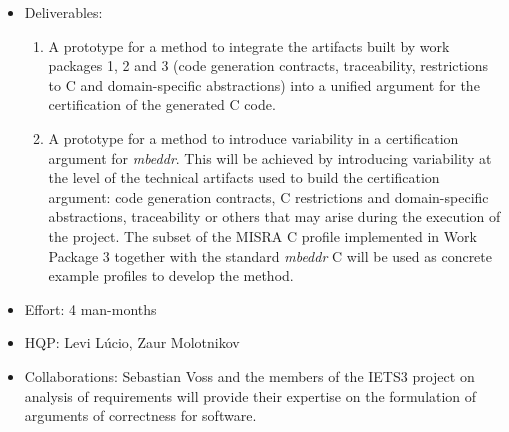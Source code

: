 \begin{itemize}
  \item Deliverables:
  \begin{enumerate}
    \item A prototype for a method to integrate the artifacts built by work
    packages 1, 2 and 3 (code generation contracts, traceability, restrictions to C and
domain-specific abstractions) into a unified argument for the certification of
the generated C code.
\item A prototype for a method to introduce variability in a certification
argument for \emph{mbeddr}. This will be achieved by introducing variability at
the level of the technical artifacts used to build the certification argument:
code generation contracts, C restrictions and domain-specific abstractions,
traceability or others that may arise during the execution of the project. The
subset of the MISRA C profile implemented in Work Package 3 together with the
standard \emph{mbeddr} C will be used as concrete example profiles to develop
the method.
  \end{enumerate}
  \item Effort: 4 man-months
  \item HQP: Levi L\'ucio, Zaur Molotnikov
  \item Collaborations: Sebastian Voss and the members of the IETS3 project on
  analysis of requirements will provide their expertise on the formulation of
  arguments of correctness for software.
\end{itemize}